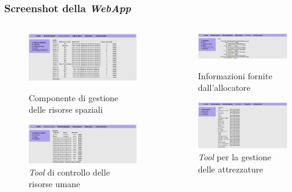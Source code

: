 \begin{frame}

\frametitle{Screenshot della \emph{WebApp}}

\begin{columns}[t]

\begin{column}{6cm}
\begin{figure}[htbp]
\includegraphics[width=5cm]{image/sres.png}
\caption {Componente di gestione delle risorse spaziali}
\label{sres}
\includegraphics[width=5cm]{image/hres.png}
\caption {\emph{Tool} di controllo delle risorse umane}
\label{hres}
\label{alloc}
\end{figure}
\end{column}

\begin{column}{6cm}
\begin{figure}[htbp]
\includegraphics[width=5cm]{image/alloc.png}
\caption {Informazioni fornite dall'allocatore}
\label{sres}
\includegraphics[width=5cm]{image/attr.png}
\caption {\emph{Tool} per la gestione delle attrezzature}
\label{hres}
\label{alloc}
\end{figure}
\end{column}

\end{columns}

\end{frame}




